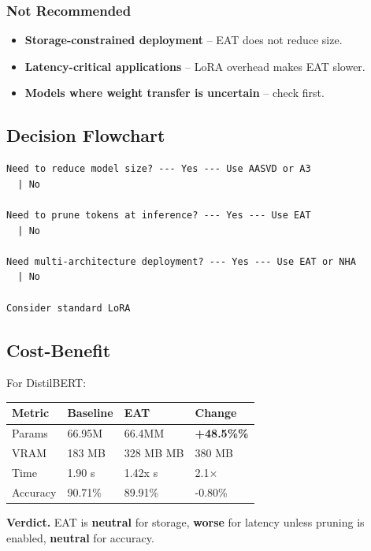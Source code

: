 \subsubsection{Not Recommended}

\begin{itemize}
\item \textbf{Storage-constrained deployment} -- EAT does not reduce size.
\item \textbf{Latency-critical applications} -- LoRA overhead makes EAT slower.
\item \textbf{Models where weight transfer is uncertain} -- check first.

\end{itemize}
\subsection{Decision Flowchart}

\begin{lstlisting}
Need to reduce model size? --- Yes --- Use AASVD or A3
  | No
   
Need to prune tokens at inference? --- Yes --- Use EAT
  | No
   
Need multi-architecture deployment? --- Yes --- Use EAT or NHA
  | No
   
Consider standard LoRA
\end{lstlisting}

\subsection{Cost-Benefit}

For DistilBERT:

\begin{table}[H]
\centering
\small
\begin{tabular}{llll}
\toprule
\textbf{Metric} & \textbf{Baseline} & \textbf{EAT} & \textbf{Change} \\
\midrule
Params & 66.95M & 66.4MM & \textbf{+48.5\%\%} \\
VRAM & 183 MB & 328 MB MB & 380 MB \\
Time & 1.90 s & 1.42x s & 2.1$\times$ \\
Accuracy & 90.71\% & 89.91\% & -0.80\% \\
\bottomrule
\end{tabular}
\end{table}

\textbf{Verdict.} EAT is \textbf{neutral} for storage, \textbf{worse} for latency unless 
pruning is enabled, \textbf{neutral} for accuracy.


